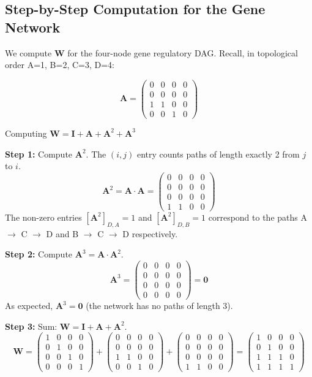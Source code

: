 \subsection{Step-by-Step Computation for the Gene Network}

We compute $\mathbf{W}$ for the four-node gene regulatory DAG. Recall, in
topological order A=1, B=2, C=3, D=4:

\[
    \mathbf{A} = \begin{pmatrix} 0&0&0&0\\0&0&0&0\\1&1&0&0\\0&0&1&0 \end{pmatrix}
\]

\begin{examplebox}{Computing $\mathbf{W} = \mathbf{I} + \mathbf{A} + \mathbf{A}^2 + \mathbf{A}^3$}

\textbf{Step 1:} Compute $\mathbf{A}^2$. The $(i,j)$ entry counts paths of
length exactly 2 from $j$ to $i$.
\[
    \mathbf{A}^2 = \mathbf{A} \cdot \mathbf{A} = \begin{pmatrix} 0&0&0&0\\0&0&0&0\\0&0&0&0\\1&1&0&0 \end{pmatrix}
\]
The non-zero entries $[\mathbf{A}^2]_{D,A} = 1$ and $[\mathbf{A}^2]_{D,B} = 1$
correspond to the paths A $\to$ C $\to$ D and B $\to$ C $\to$ D respectively.

\medskip
\textbf{Step 2:} Compute $\mathbf{A}^3 = \mathbf{A} \cdot \mathbf{A}^2$.
\[
    \mathbf{A}^3 = \begin{pmatrix} 0&0&0&0\\0&0&0&0\\0&0&0&0\\0&0&0&0 \end{pmatrix} = \mathbf{0}
\]
As expected, $\mathbf{A}^3 = \mathbf{0}$ (the network has no paths of length 3).

\medskip
\textbf{Step 3:} Sum: $\mathbf{W} = \mathbf{I} + \mathbf{A} + \mathbf{A}^2$.
\[
    \mathbf{W} = \begin{pmatrix}1&0&0&0\\0&1&0&0\\0&0&1&0\\0&0&0&1\end{pmatrix}
    + \begin{pmatrix}0&0&0&0\\0&0&0&0\\1&1&0&0\\0&0&1&0\end{pmatrix}
    + \begin{pmatrix}0&0&0&0\\0&0&0&0\\0&0&0&0\\1&1&0&0\end{pmatrix}
    = \begin{pmatrix}1&0&0&0\\0&1&0&0\\1&1&1&0\\1&1&1&1\end{pmatrix}
\]


\end{examplebox}
